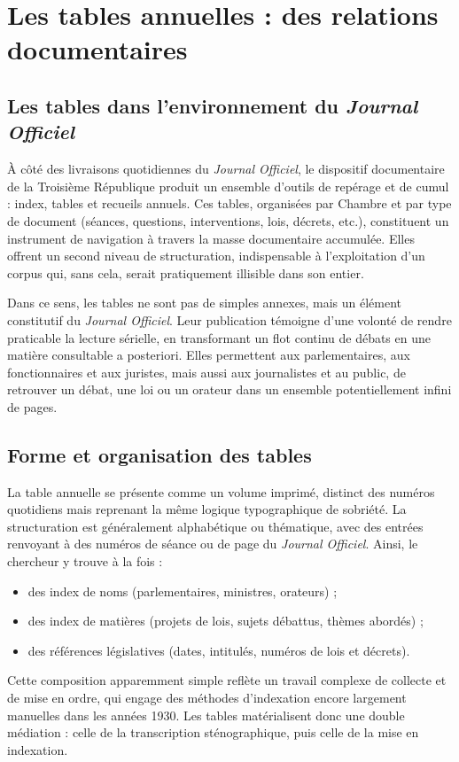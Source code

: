 \chapter{Les tables annuelles : des relations documentaires}

\section{Les tables dans l’environnement du \emph{Journal Officiel}}

À côté des livraisons quotidiennes du \emph{Journal Officiel}, le dispositif documentaire de la Troisième République produit un ensemble d’outils de repérage et de cumul : index, tables et recueils annuels. Ces tables, organisées par Chambre et par type de document (séances, questions, interventions, lois, décrets, etc.), constituent un instrument de navigation à travers la masse documentaire accumulée. Elles offrent un second niveau de structuration, indispensable à l’exploitation d’un corpus qui, sans cela, serait pratiquement illisible dans son entier.

Dans ce sens, les tables ne sont pas de simples annexes, mais un élément constitutif du \emph{Journal Officiel}. Leur publication témoigne d’une volonté de rendre praticable la lecture sérielle, en transformant un flot continu de débats en une matière consultable a posteriori. Elles permettent aux parlementaires, aux fonctionnaires et aux juristes, mais aussi aux journalistes et au public, de retrouver un débat, une loi ou un orateur dans un ensemble potentiellement infini de pages.

\section{Forme et organisation des tables}

La table annuelle se présente comme un volume imprimé, distinct des numéros quotidiens mais reprenant la même logique typographique de sobriété. La structuration est généralement alphabétique ou thématique, avec des entrées renvoyant à des numéros de séance ou de page du \emph{Journal Officiel}. Ainsi, le chercheur y trouve à la fois :

\begin{itemize}
\item des index de noms (parlementaires, ministres, orateurs) ;
\item des index de matières (projets de lois, sujets débattus, thèmes abordés) ;
\item des références législatives (dates, intitulés, numéros de lois et décrets).

\end{itemize}
Cette composition apparemment simple reflète un travail complexe de collecte et de mise en ordre, qui engage des méthodes d’indexation encore largement manuelles dans les années 1930. Les tables matérialisent donc une double médiation : celle de la transcription sténographique, puis celle de la mise en indexation.

